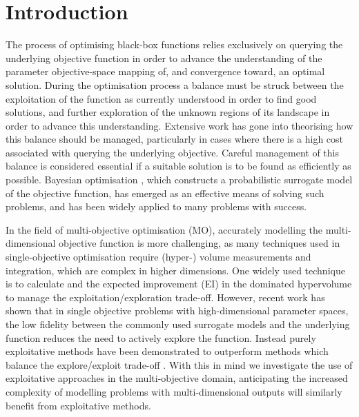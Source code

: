 \documentclass[conference]{IEEEtran}
\newcommand\ei{EI\xspace}
\begin{document}
\section{Introduction}
The process of optimising black-box functions relies exclusively on querying the underlying objective function in order to advance the understanding of the parameter objective-space mapping of, and convergence toward, an optimal solution. During the optimisation process a balance must be struck between the exploitation of the function as currently understood in order to find good solutions, and further exploration of the unknown regions of its landscape in order to advance this understanding. Extensive work has gone into theorising how this balance should be managed, particularly in cases where there is a high cost associated with querying the underlying objective. Careful management of this balance is considered essential if a suitable solution is to be found as efficiently as possible. Bayesian optimisation \cite{jones1998efficient}, which constructs a probabilistic surrogate model of the objective function, has emerged as an effective means of solving such problems, and has been widely applied to many problems with success.

In the field of multi-objective optimisation (MO), accurately modelling the multi-dimensional objective function is more challenging, as many techniques used in single-objective optimisation require (hyper-) volume measurements and integration, which are complex in higher dimensions. One widely used technique is to calculate and the expected improvement (\ei) \cite{jones1998efficient} in the dominated hypervolume to manage the exploitation/exploration trade-off. However, recent work has shown that in single objective problems with high-dimensional parameter spaces, the low fidelity between the commonly used surrogate models and the underlying function reduces the need to actively explore the function. Instead purely exploitative methods have been demonstrated to outperform methods which balance the explore/exploit trade-off \cite{death2019greed}. With this in mind we investigate the use of exploitative approaches in the multi-objective domain, anticipating the increased complexity of modelling problems with multi-dimensional outputs will similarly benefit from exploitative methods. 
\end{document}
